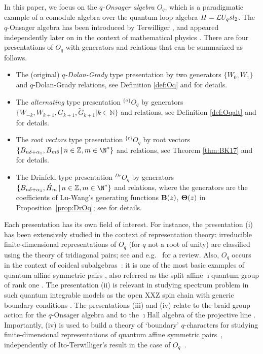 \documentclass[11pt]{amsart}
\numberwithin{equation}{section}
\numberwithin{equation}{section}
\begin{document}
 In this paper, we focus on the  
\textit{$q$-Onsager algebra} $O_q$, which is a paradigmatic example of a comodule algebra over the quantum loop algebra $H=\mathcal{L} U_q sl_2$.
 The $q$-Onsager algebra has been introduced  by Terwilliger \cite{Ter03}, and  appeared independently later on in the context of mathematical physics \cite{B05}.  There are four presentations of $O_q$ with generators and relations that can be summarized as follows. 
 \begin{itemize}
 	\item[(i)] The (original) {\it $q$-Dolan-Grady} type presentation  by two generators $\{W_0,W_1\}$ and $q$-Dolan-Grady relations, see Definition \ref{def:Oq} and \cite{Ter03,B05} for details.\vspace{1mm}
 	
 	\item[(ii)] The {\it alternating} type presentation $^{\{a\}}O_q$ by generators $\{W_{-k},W_{k+1},G_{k+1},{\tilde G}_{k+1}|k\in {\mathbb N}\}$ and relations, see Definition \ref{def:Oqalt} and  \cite{BasBel,Ter21}  for details.\vspace{1mm}
 	
 	\item[(iii)] The {\it root vectors} type presentation $^{\{r\}}O_q$ by root vectors $\{B_{n\delta+\alpha_1}, B_{m \delta} \, | \, n\in {\mathbb Z}, m\in \N^*\}$ and relations, see Theorem \ref{thm:BK17} and \cite{BK17} for details.\vspace{1mm}
 	
 	\item[(iv)] The Drinfeld type presentation $^{Dr}O_q$ by generators $\{B_{n\delta+\alpha_1}, {\acute H}_{m}\, | \, n\in {\mathbb Z}, m\in \N^*\}$ and relations, where the generators are the coefficients of Lu-Wang's generating functions ${\bf B}(z)$, ${\bf \Theta}(z)$ in Proposition~\ref{prop:DrOq}; see \cite{LW20} for details.\vspace{1mm}
 \end{itemize}

 Each presentation has its own field of interest. For instance, the presentation (i) has been extensively studied in the context of representation theory: irreducible finite-dimensional representations of $O_q$ (for $q$ not a root of unity) are classified using the theory of tridiagonal pairs; see \cite{IT10} and e.g.\ \cite{INT10,NT17} for a review. Also, $O_q$ occurs in the context of coideal subalgebras~\cite{BB09,BB12}: it is  one of the most basic examples of quantum affine symmetric pairs \cite{Ko12},  also referred as the split affine	$\imath$quantum group of rank one \cite{LW20}.
The presentation (ii) is relevant in studying spectrum problem in such quantum integrable models as the open XXZ spin chain with generic boundary conditions \cite{BK05,BB12,BB16,BGL25}. The presentations (iii) and (iv) relate to  the braid group action for the $q$-Onsager algebra \cite{BK17} and to the $\imath$Hall algebra of the projective line \cite{LW20b,LW22}. Importantly, (iv) is used to build a theory of `boundary' $q$-characters for studying finite-dimensional representations of quantum affine symmetric pairs~\cite{P24,LPr25},  independently of Ito-Terwilliger's result in the case of $O_q$~\cite{IT10}.
\end{document}
